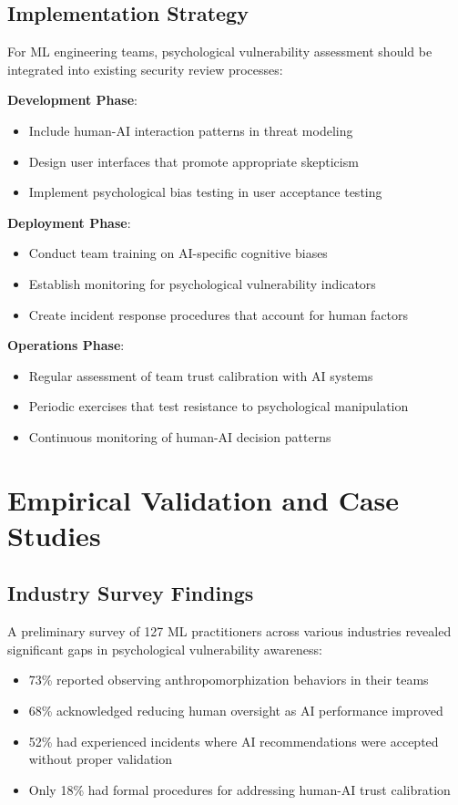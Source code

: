 \documentclass[11pt,a4paper]{article}
\begin{document}
\subsection{Implementation Strategy}

For ML engineering teams, psychological vulnerability assessment should be integrated into existing security review processes:

\textbf{Development Phase}:
\begin{itemize}
\item Include human-AI interaction patterns in threat modeling
\item Design user interfaces that promote appropriate skepticism
\item Implement psychological bias testing in user acceptance testing
\end{itemize}

\textbf{Deployment Phase}:
\begin{itemize}
\item Conduct team training on AI-specific cognitive biases
\item Establish monitoring for psychological vulnerability indicators
\item Create incident response procedures that account for human factors
\end{itemize}

\textbf{Operations Phase}:
\begin{itemize}
\item Regular assessment of team trust calibration with AI systems
\item Periodic exercises that test resistance to psychological manipulation
\item Continuous monitoring of human-AI decision patterns
\end{itemize}

\section{Empirical Validation and Case Studies}

\subsection{Industry Survey Findings}

A preliminary survey of 127 ML practitioners across various industries revealed significant gaps in psychological vulnerability awareness:

\begin{itemize}
\item 73\% reported observing anthropomorphization behaviors in their teams
\item 68\% acknowledged reducing human oversight as AI performance improved
\item 52\% had experienced incidents where AI recommendations were accepted without proper validation
\item Only 18\% had formal procedures for addressing human-AI trust calibration
\end{itemize}
\end{document}
